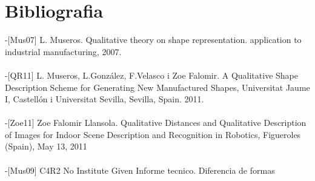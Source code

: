 \documentclass{article}
\begin{document}
\section{Bibliografia}
-[Mus07] L. Museros. Qualitative theory on shape representation. application to industrial manufacturing, 2007.
\\
\\
-[QR11]  L. Museros, L.González, F.Velasco i Zoe Falomir. A Qualitative Shape Description Scheme for Generating New Manufactured Shapes, Universitat Jaume I, Castellón i Universitat  Sevilla, Sevilla, Spain. 2011.
\\
\\
-[Zoe11] Zoe Falomir Llansola. Qualitative Distances and Qualitative Description of Images for Indoor Scene Description and Recognition in Robotics, Figueroles (Spain), May 13, 2011
\\
\\
-[Mus09] C4R2 No Institute Given Informe tecnico. Diferencia de formas
\end{document}
